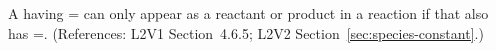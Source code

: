 A \Species having = can only appear as a
reactant or product in a reaction if that \Species also has
=.  (References: L2V1
Section~4.6.5; L2V2 Section~\ref{sec:species-constant}.)

